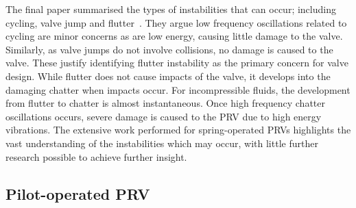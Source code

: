 The final paper summarised the types of instabilities that can occur; including cycling, valve jump and flutter~\cite{Hos2017DynamicRecommendations}.
They argue low frequency oscillations related to cycling are minor concerns as are low energy, causing little damage to the valve. Similarly, as valve jumps do not involve collisions, no damage is caused to the valve.
%
These justify identifying flutter instability as the primary concern for valve design. While flutter does not cause impacts of the valve, it develops into the damaging chatter when impacts occur. For incompressible fluids, the development from flutter to chatter is almost instantaneous. Once high frequency chatter oscillations occurs, severe damage is caused to the PRV due to high energy vibrations. %
The extensive work performed for spring-operated PRVs highlights the vast understanding of the  instabilities which may occur, with little further research possible to achieve further insight.

\vspace{-10pt}
\subsection{Pilot-operated PRV}


